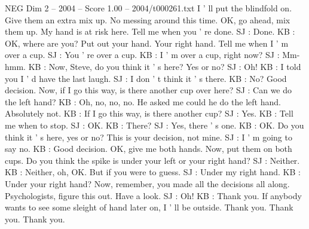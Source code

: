\begin{textsample}{NEG Dim 2 – 2004 – Score 1.00 – 2004/t000261.txt}
I ' ll put the blindfold on.
Give them an extra mix up.
No messing around this time.
OK, go ahead, mix them up.
My hand is at risk here.
Tell me when you ' re done.
SJ : Done.
KB : OK, where are you?
Put out your hand.
Your right hand.
Tell me when I ' m over a cup.
SJ : You ' re over a cup.
KB : I ' m over a cup, right now?
SJ : Mm-hmm.
KB : Now, Steve, do you think it ' s here?
Yes or no?
SJ : Oh!
KB : I told you I ' d have the last laugh.
SJ : I don ' t think it ' s there.
KB : No?
Good decision.
Now, if I go this way, is there another cup over here?
SJ : Can we do the left hand?
KB : Oh, no, no, no.
He asked me could he do the left hand.
Absolutely not.
KB : If I go this way, is there another cup?
SJ : Yes.
KB : Tell me when to stop.
SJ : OK.
KB : There?
SJ : Yes, there ' s one.
KB : OK.
Do you think it ' s here, yes or no?
This is your decision, not mine.
SJ : I ' m going to say no.
KB : Good decision.
OK, give me both hands.
Now, put them on both cups.
Do you think the spike is under your left or your right hand?
SJ : Neither.
KB : Neither, oh, OK.
But if you were to guess.
SJ : Under my right hand.
KB : Under your right hand?
Now, remember, you made all the decisions all along.
Psychologists, figure this out.
Have a look.
SJ : Oh!
KB : Thank you.
If anybody wants to see some sleight of hand later on, I ' ll be outside.
Thank you.
Thank you.
Thank you.

\end{textsample}
